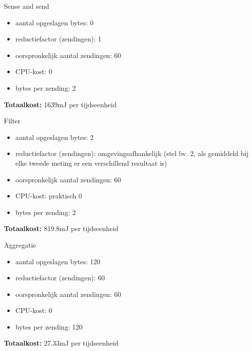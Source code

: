 \documentclass[presentation, bigger]{beamer}
\begin{document}
\begin{frame}{Sense and send}
  \begin{itemize}
  \item aantal opgeslagen bytes: 0
  \item reductiefactor (zendingen): 1
  \item oorspronkelijk aantal zendingen: 60
  \item CPU-kost: 0
  \item bytes per zending: 2
  \end{itemize}

  \begin{exampleblock}{}
    \textbf{Totaalkost:} 1639mJ per tijdseenheid
  \end{exampleblock}

\end{frame}

\begin{frame}{Filter}
  \begin{itemize}
  \item aantal opgeslagen bytes: 2
  \item reductiefactor (zendingen): omgevingsafhankelijk (stel bv. 2, als gemiddeld bij elke tweede meting er een verschillend resultaat is)
  \item oorspronkelijk aantal zendingen: 60
  \item CPU-kost: praktisch 0
  \item bytes per zending: 2
  \end{itemize}
  
  \begin{exampleblock}{}
    \textbf{Totaalkost:} 819.8mJ per tijdseenheid
  \end{exampleblock}
\end{frame}

\begin{frame}{Aggregatie}
  \begin{itemize}
  \item aantal opgeslagen bytes: 120
  \item reductiefactor (zendingen): 60
  \item oorspronkelijk aantal zendingen: 60
  \item CPU-kost: 0
  \item bytes per zending: 120
  \end{itemize}
  
  \begin{exampleblock}{}
    \textbf{Totaalkost:} 27.33mJ per tijdseenheid
  \end{exampleblock}
\end{frame}
\end{document}
